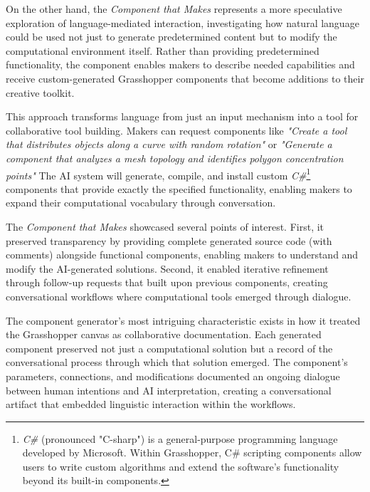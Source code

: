 On the other hand, the \textit{Component that Makes} represents a more speculative exploration of language-mediated interaction, investigating how natural language could be used not just to generate predetermined content but to modify the computational environment itself. Rather than providing predetermined functionality, the component enables makers to describe needed capabilities and receive custom-generated Grasshopper components that become additions to their creative toolkit.

\vspace{0.5cm}

This approach transforms language from just an input mechanism into a tool for collaborative tool building. Makers can request components like \textit{"Create a tool that distributes objects along a curve with random rotation"} or \textit{"Generate a component that analyzes a mesh topology and identifies polygon concentration points"} The AI system will generate, compile, and install custom \textit{C\#}\footnote{\textit{C\#} (pronounced "C-sharp") is a general-purpose programming language developed by Microsoft. Within Grasshopper, C\# scripting components allow users to write custom algorithms and extend the software's functionality beyond its built-in components.} components that provide exactly the specified functionality, enabling makers to expand their computational vocabulary through conversation.

\vspace{0.5cm}

The \textit{Component that Makes} showcased several points of interest. First, it preserved transparency by providing complete generated source code (with comments) alongside functional components, enabling makers to understand and modify the AI-generated solutions. Second, it enabled iterative refinement through follow-up requests that built upon previous components, creating conversational workflows where computational tools emerged through dialogue.

\vspace{0.5cm}

The component generator's most intriguing characteristic exists in how it treated the Grasshopper canvas as collaborative documentation. Each generated component preserved not just a computational solution but a record of the conversational process through which that solution emerged. The component's parameters, connections, and modifications documented an ongoing dialogue between human intentions and AI interpretation, creating a conversational artifact that embedded linguistic interaction within the workflows.

